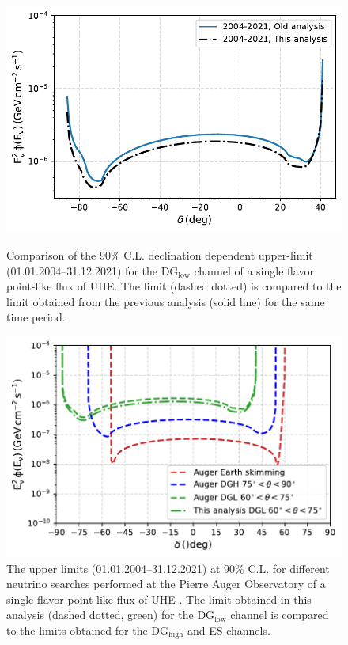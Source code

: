 \begin{figure}[h!]
  \centering
  \includegraphics[width=\textwidth]{thesis_figures/PointLimits/Point_comp_combined_2.pdf}
  \caption{Comparison of the 90\% C.L. declination dependent upper-limit (01.01.2004–31.12.2021) for the DG$_{\text{low}}$ channel of a single flavor point-like flux of UHE. The limit (dashed dotted) is compared to the limit obtained from the previous analysis (solid line) for the same time period.}
  \label{fig:Dec_limit_comb2}
  \includegraphics[width=\textwidth]{thesis_figures/PointLimits/Point_comp_combined_3.pdf}
  \caption{The upper limits  (01.01.2004–31.12.2021) at 90\% C.L. for different neutrino searches performed at the Pierre Auger Observatory of a single flavor point-like flux of UHE . The limit obtained in this analysis (dashed dotted, green) for the DG$_{\text{low}}$ channel is compared to the limits obtained for the DG$_{\text{high}}$ and ES channels.}
  \label{fig:Dec_limit_comb3}
\end{figure}


